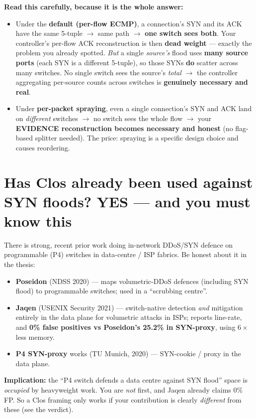 \documentclass[11pt]{article}
\newcommand{\yes}{\textcolor{good}{\textbf{YES}}}
\begin{document}
\textbf{Read this carefully, because it is the whole answer:}
\begin{itemize}[leftmargin=1.4em]
  \item Under the \textbf{default (per-flow ECMP)}, a connection's SYN and its ACK have the same 5-tuple
  $\to$ same path $\to$ \textbf{one switch sees both}. Your controller's per-flow ACK reconstruction is
  then \textbf{dead weight} --- exactly the problem you already spotted. \emph{But} a single \emph{source's}
  flood uses \textbf{many source ports} (each SYN is a different 5-tuple), so those SYNs \textbf{do} scatter
  across many switches. No single switch sees the source's \emph{total} $\to$ the controller aggregating
  per-source counts across switches is \textbf{genuinely necessary and real}.
  \item Under \textbf{per-packet spraying}, even a single connection's SYN and ACK land on \emph{different}
  switches $\to$ no switch sees the whole flow $\to$ your \textbf{EVIDENCE reconstruction becomes
  necessary and honest} (no flag-based splitter needed). The price: spraying is a specific design choice
  and causes reordering.
\end{itemize}

\section{Has Clos already been used against SYN floods? \yes{} --- and you must know this}
There is strong, recent prior work doing in-network DDoS/SYN defence on programmable (P4) switches in
data-centre / ISP fabrics. Be honest about it in the thesis:
\begin{itemize}[leftmargin=1.4em]
  \item \textbf{Poseidon} (NDSS 2020) --- maps volumetric-DDoS defences (including SYN flood) to
  programmable switches; used in a ``scrubbing centre''.
  \item \textbf{Jaqen} (USENIX Security 2021) --- switch-native detection \emph{and} mitigation entirely
  in the data plane for volumetric attacks in ISPs; reports line-rate, and \textbf{0\% false positives vs
  Poseidon's 25.2\% in SYN-proxy}, using $6\times$ less memory.
  \item \textbf{P4 SYN-proxy} works (TU Munich, 2020) --- SYN-cookie / proxy in the data plane.
\end{itemize}
\textbf{Implication:} the ``P4 switch defends a data centre against SYN flood'' space is \emph{occupied} by
heavyweight work. You are \emph{not} first, and Jaqen already claims 0\% FP. So a Clos framing only works if
your contribution is clearly \emph{different} from these (see the verdict).
\end{document}

